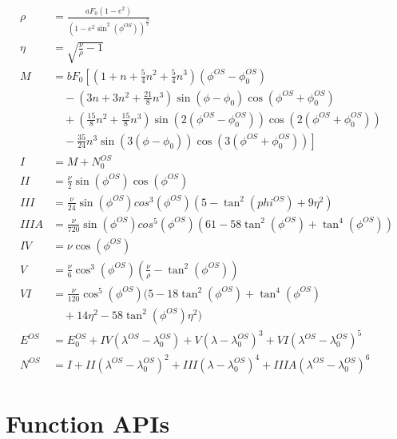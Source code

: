 \documentclass[letterpaper,10pt,english]{sphinxmanual}
\begin{document}
\begin{equation*}
\begin{split}\rho &= \frac{aF_0(1-e^2)}{\left(1-e^2\sin^2(\phi^{OS})\right)^{\frac{3}{2}}} \\
\eta &= \sqrt{\frac{\nu}{\rho}-1} \\
M &= bF_0\left[\left(1+n+\frac{5}{4}n^2+\frac{5}{4}n^3\right)(\phi^{OS}-\phi^{OS}_0)\right. \\
&\quad-\left(3n+3n^2+\frac{21}{8}n^3\right)\sin(\phi-\phi_0)\cos(\phi^{OS}+\phi^{OS}_0) \\
&\quad+\left(\frac{15}{8}n^2+\frac{15}{8}n^3\right)\sin(2(\phi^{OS}-\phi^{OS}_0))\cos(2(\phi^{OS}+\phi^{OS}_0)) \\
&\left.\quad-\frac{35}{24}n^3\sin(3(\phi-\phi_0))\cos(3(\phi^{OS}+\phi^{OS}_0))\right] \\
I &= M + N^{OS}_0 \\
II &= \frac{\nu}{2}\sin(\phi^{OS})\cos(\phi^{OS}) \\
III &= \frac{\nu}{24}\sin(\phi^{OS})cos^3(\phi^{OS})(5-\tan^2(phi^{OS})+9\eta^2) \\
IIIA &= \frac{\nu}{720}\sin(\phi^{OS})cos^5(\phi^{OS})(61-58\tan^2(\phi^{OS})+\tan^4(\phi^{OS})) \\
IV &= \nu\cos(\phi^{OS}) \\
V &= \frac{\nu}{6}\cos^3(\phi^{OS})\left(\frac{\nu}{\rho}-\tan^2(\phi^{OS})\right) \\
VI &= \frac{\nu}{120}\cos^5(\phi^{OS})(5-18\tan^2(\phi^{OS})+\tan^4(\phi^{OS}) \\
&\quad+14\eta^2-58\tan^2(\phi^{OS})\eta^2) \\
E^{OS} &= E^{OS}_0+IV(\lambda^{OS}-\lambda^{OS}_0)+V(\lambda-\lambda^{OS}_0)^3+VI(\lambda^{OS}-\lambda^{OS}_0)^5 \\
N^{OS} &= I + II(\lambda^{OS}-\lambda^{OS}_0)^2+III(\lambda-\lambda^{OS}_0)^4+IIIA(\lambda^{OS}-\lambda^{OS}_0)^6\end{split}
\end{equation*}

\chapter{Function APIs}
\label{\detokenize{index:module-flood_tool}}\label{\detokenize{index:function-apis}}
\end{document}
